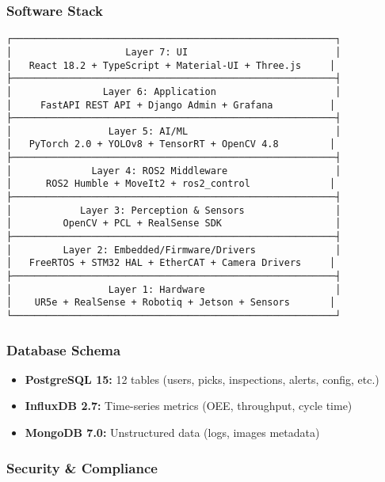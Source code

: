 \documentclass[
]{article}
\providecommand{\tightlist}{%
  \setlength{\itemsep}{0pt}\setlength{\parskip}{0pt}}
\begin{document}
\hypertarget{software-stack}{%
\subsubsection{Software Stack}\label{software-stack}}

\begin{verbatim}
┌─────────────────────────────────────────────────────────┐
│                    Layer 7: UI                          │
│   React 18.2 + TypeScript + Material-UI + Three.js     │
├─────────────────────────────────────────────────────────┤
│                Layer 6: Application                     │
│     FastAPI REST API + Django Admin + Grafana          │
├─────────────────────────────────────────────────────────┤
│                 Layer 5: AI/ML                          │
│   PyTorch 2.0 + YOLOv8 + TensorRT + OpenCV 4.8         │
├─────────────────────────────────────────────────────────┤
│              Layer 4: ROS2 Middleware                   │
│      ROS2 Humble + MoveIt2 + ros2_control              │
├─────────────────────────────────────────────────────────┤
│            Layer 3: Perception & Sensors                │
│         OpenCV + PCL + RealSense SDK                    │
├─────────────────────────────────────────────────────────┤
│         Layer 2: Embedded/Firmware/Drivers              │
│   FreeRTOS + STM32 HAL + EtherCAT + Camera Drivers     │
├─────────────────────────────────────────────────────────┤
│                 Layer 1: Hardware                       │
│    UR5e + RealSense + Robotiq + Jetson + Sensors       │
└─────────────────────────────────────────────────────────┘
\end{verbatim}

\hypertarget{database-schema}{%
\subsubsection{Database Schema}\label{database-schema}}

\begin{itemize}
\tightlist
\item
  \textbf{PostgreSQL 15:} 12 tables (users, picks, inspections, alerts,
  config, etc.)
\item
  \textbf{InfluxDB 2.7:} Time-series metrics (OEE, throughput, cycle
  time)
\item
  \textbf{MongoDB 7.0:} Unstructured data (logs, images metadata)
\end{itemize}

\hypertarget{security-compliance}{%
\subsubsection{Security \& Compliance}\label{security-compliance}}
\end{document}
